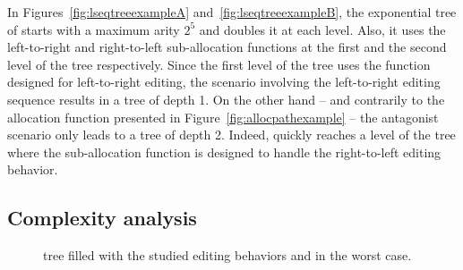 


In Figures~\ref{fig:lseqtreeexampleA} and~\ref{fig:lseqtreeexampleB}, the
exponential tree of \LSEQ starts with a maximum arity $2^5$ and doubles it at
each level. Also, it uses the left-to-right and right-to-left sub-allocation
functions at the first and the second level of the tree respectively. Since the
first level of the tree uses the function designed for left-to-right editing,
the scenario involving the left-to-right editing sequence results in a tree of
depth 1. On the other hand -- and contrarily to the allocation function
presented in Figure~\ref{fig:allocpathexample} -- the antagonist scenario only
leads to a tree of depth 2. Indeed, \LSEQ quickly reaches a level of the tree
where the sub-allocation function is designed to handle the right-to-left
editing behavior.



\subsection{Complexity analysis}
\label{subsec:complexity}

\begin{figure}
  \centering
  \hspace{5pt}
  \hspace{5pt}
  \caption{\label{fig:complexity} \LSEQ tree filled with the studied editing
    behaviors and in the worst case.}
\end{figure}


